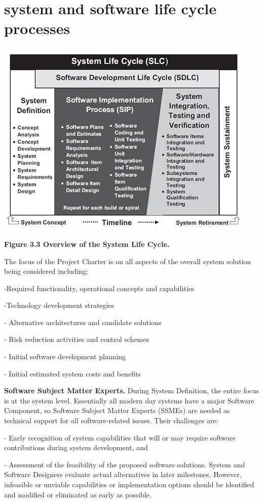 \documentclass{book}
\begin{document}
\setcounter{chapter}{2}
\chapter{system and software life cycle processes}
\includegraphics{1.jpg}

\textbf{Figure 3.3 Overview of the System Life Cycle.}

The focus of the Project Charter is on all aspects of the overall system solution being considered including:

-Required functionality, operational concepts and capabilities

-Technology development strategies

- Alternative architectures and candidate solutions

- Risk reduction activities and control schemes

- Initial software development planning

- Initial estimated system costs and benefits

\textbf{Software Subject Matter Experts.} During System Definition, the entire focus is at the system level. Essentially all modern day systems have a major Software Component, so Software Subject Matter Experts (SSMEs) are needed as technical support for all software-related issues. Their challenges are:

- Early recognition of system capabilities that will or may require software contributions during system development, and

- Assessment of the feasibility of the proposed software solutions. System and Software Designers evaluate actual alternatives in later milestones. However, infeasible or unviable capabilities or implementation options should be identified and modified or eliminated as early as possible.
\end{document}
